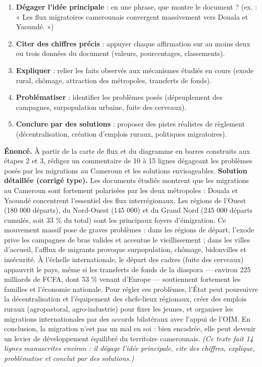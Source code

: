 \documentclass[11pt]{article}
\begin{document}
\begin{methode}
\begin{enumerate}
\item \textbf{Dégager l'idée principale} : en une phrase, que montre le document ? (ex. : « Les flux migratoires camerounais convergent massivement vers Douala et Yaoundé. »)
\item \textbf{Citer des chiffres précis} : appuyer chaque affirmation sur au moins deux ou trois données du document (valeurs, pourcentages, classements).
\item \textbf{Expliquer} : relier les faits observés aux mécanismes étudiés en cours (exode rural, chômage, attraction des métropoles, transferts de fonds).
\item \textbf{Problématiser} : identifier les problèmes posés (dépeuplement des campagnes, surpopulation urbaine, fuite des cerveaux).
\item \textbf{Conclure par des solutions} : proposer des pistes réalistes de règlement (décentralisation, création d'emplois ruraux, politiques migratoires).
\end{enumerate}
\end{methode}

\begin{exoresolu}
\textbf{Énoncé.} À partir de la carte de flux et du diagramme en barres construits aux étapes 2 et 3, rédigez un commentaire de 10 à 15 lignes dégageant les problèmes posés par les migrations au Cameroun et les solutions envisageables.
\tcblower
\textbf{Solution détaillée (corrigé type).}
Les documents étudiés montrent que les migrations au Cameroun sont fortement polarisées par les deux métropoles : Douala et Yaoundé concentrent l'essentiel des flux interrégionaux. Les régions de l'Ouest (180 000 départs), du Nord-Ouest (145 000) et du Grand Nord (245 000 départs cumulés, soit 33 \% du total) sont les principaux foyers d'émigration. Ce mouvement massif pose de graves problèmes : dans les régions de départ, l'exode prive les campagnes de bras valides et accentue le vieillissement ; dans les villes d'accueil, l'afflux de migrants provoque surpopulation, chômage, bidonvilles et insécurité. À l'échelle internationale, le départ des cadres (fuite des cerveaux) appauvrit le pays, même si les transferts de fonds de la diaspora — environ 225 milliards de FCFA, dont 53 \% venant d'Europe — soutiennent fortement les familles et l'économie nationale. Pour régler ces problèmes, l'État peut poursuivre la décentralisation et l'équipement des chefs-lieux régionaux, créer des emplois ruraux (agropastoral, agro-industrie) pour fixer les jeunes, et organiser les migrations internationales par des accords bilatéraux avec l'appui de l'OIM. En conclusion, la migration n'est pas un mal en soi : bien encadrée, elle peut devenir un levier de développement équilibré du territoire camerounais.
\emph{(Ce texte fait 14 lignes manuscrites environ : il dégage l'idée principale, cite des chiffres, explique, problématise et conclut par des solutions.)}
\end{exoresolu}
\end{document}
